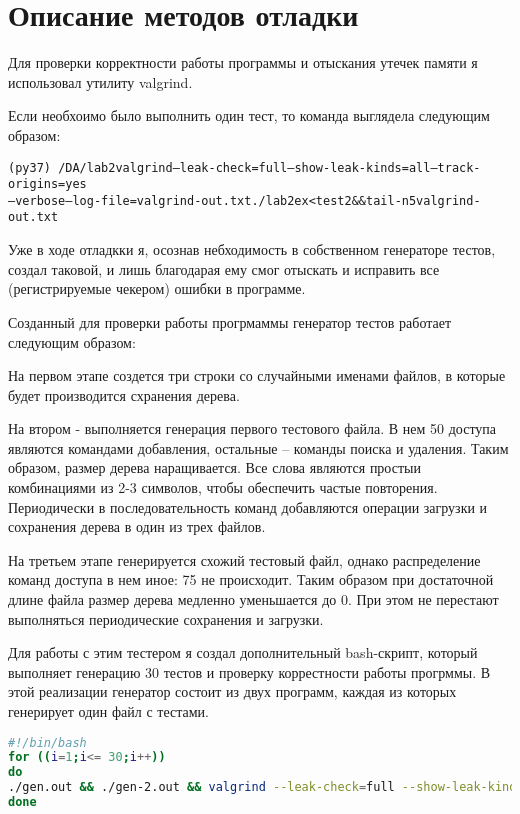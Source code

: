 \section{Описание методов отладки}
Для проверки корректности работы программы и отыскания утечек памяти я использовал утилиту valgrind.

Если необхоимо было выполнить один тест, то команда выглядела следующим образом:

\begin{alltt}
	(py37) ~ /DA/lab2 valgrind --leak-check=full --show-leak-kinds=all --track-origins=yes
	--verbose --log-file=valgrind-out.txt ./lab2ex <test2 \&\& tail -n5 valgrind-out.txt
\end{alltt}

Уже в ходе отладкки я, осознав небходимость в собственном генераторе тестов, создал таковой, и лишь благодарая ему смог отыскать и исправить все (регистрируемые чекером) ошибки в программе.

Созданный для проверки работы прогрмаммы генератор тестов работает следующим образом:

На первом этапе создется три строки со случайными именами файлов, в которые будет производится схранения дерева.

На втором - выполняется генерация первого тестового файла. В нем 50%
доступа являются командами добавления, остальные – команды поиска и удаления.
Таким образом, размер дерева наращивается. Все слова являются простыи комбинациями из 2-3 символов, чтобы обеспечить частые повторения. Периодически в последовательность команд добавляются операции загрузки и сохранения дерева в один
из трех файлов.

На третьем этапе генерируется схожий тестовый файл, однако распределение команд доступа в нем иное: 75%
не происходит. Таким образом при достаточной длине файла размер дерева медленно
уменьшается до 0. При этом не перестают выполняться периодические сохранения и
загрузки.

Для работы с этим тестером я создал дополнительный bash-скрипт, который выполняет генерацию 30 тестов и проверку коррестности работы прогрммы. В этой реализации генератор состоит из двух программ, каждая из которых генерирует один
файл с тестами.
\begin{lstlisting}[language=bash]
#!/bin/bash
for ((i=1;i<= 30;i++))
do
./gen.out && ./gen-2.out && valgrind --leak-check=full --show-leak-kinds=all --track-origins=yes --verbose --log-file=valgrind-out.txt ./lab2ex < test_of_absolutia > res-test&& tail -n5 valgrind-out.txt && valgrind --leak-check=full --show-leak-kinds=all --track-origins=yes --verbose --log-file=valgrind-out.txt ./lab2ex < second_test_of_absolutia > res-test && tail -n5 valgrind-out.txt 
done
\end{lstlisting}
\pagebreak

